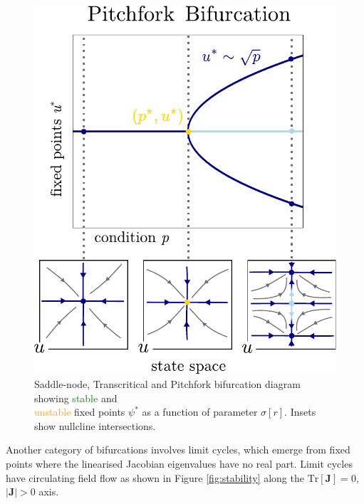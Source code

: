 \begin{figure}[H]
\includegraphics[scale=0.35]{figures/pitchfork}
\caption{Saddle-node, Transcritical and Pitchfork bifurcation diagram showing
\textcolor{Green}{stable} and \\\textcolor{orange}{unstable} fixed points $\psi^*$
as a function of parameter $\sigma[r]$. Insets show nullcline intersections.}
\label{fig:bifurcations}
\end{figure}
Another category of bifurcations involves limit cycles, which emerge from fixed
points where the linearised Jacobian eigenvalues have no real part. Limit cycles
have circulating field flow as shown in Figure \ref{fig:stability} along the
$\mathrm{Tr}[\mathbf{J}]=0$, $|\mathbf{J}|>0$ axis.

